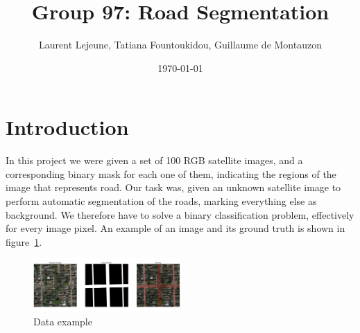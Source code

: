 \documentclass[10pt,conference,compsocconf]{IEEEtran}
\author{Laurent Lejeune, Tatiana Fountoukidou, Guillaume de Montauzon}
\date{\today}
\title{Group 97: Road Segmentation}
\begin{document}
	
	\maketitle
	
	\section{Introduction}
	In this project we were given a set of 100 RGB satellite images, and a corresponding binary mask for each one of them, indicating the regions of the image that represents road. Our task was, given an unknown satellite image to perform automatic segmentation of the roads, marking everything else as background. We therefore have to solve a binary classification problem, effectively for every image pixel. An example of an image and its ground truth is shown in figure~\ref{example}.
	\begin{figure}[h]
		\centering
		\includegraphics[width=0.5\textwidth]{example.png}
		\caption{Data example}
		\label{example}
	\end{figure}
	
	
\end{document}
